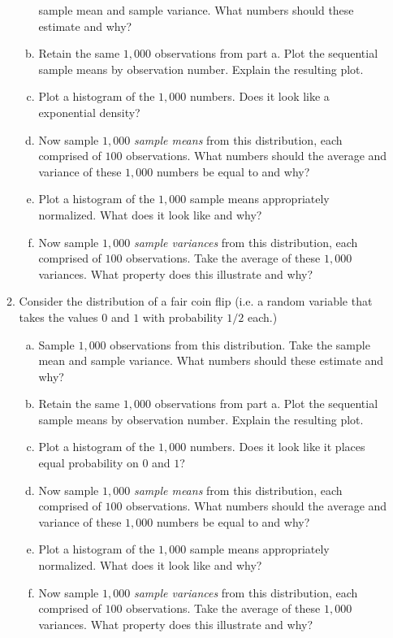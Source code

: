\documentclass[12pt]{article}
\begin{document}
\begin{enumerate}[1.]
\begin{enumerate}[1.]
\begin{enumerate}[a.]
    sample mean and sample variance. What numbers should these
    estimate and why?
  \item Retain the same $1,000$ observations from part a. Plot the
    sequential sample means by observation number. Explain the
    resulting plot.
  \item Plot a histogram of the $1,000$ numbers. Does it look like a
    exponential density?
  \item Now sample $1,000$ {\em sample means} from this distribution,
    each comprised of $100$ observations. What numbers should the
    average and variance of these $1,000$ numbers be equal to and why?
 \item Plot a histogram of the $1,000$ sample means appropriately
    normalized. What does it look like and why?
  \item Now sample $1,000$ {\em sample variances} from this distribution,
    each comprised of $100$ observations. Take the average of these
    $1,000$ variances. What property does this illustrate and why?
  \end{enumerate}
\item  Consider the distribution of a fair coin flip (i.e. a random variable
  that takes the values $0$ and $1$ with probability $1/2$ each.)
  \begin{enumerate}[a.]
  \item Sample $1,000$ observations from this distribution. Take the
    sample mean and sample variance. What numbers should these
    estimate and why?
  \item Retain the same $1,000$ observations from part a. Plot the
    sequential sample means by observation number. Explain the
    resulting plot.
  \item Plot a histogram of the $1,000$ numbers. Does it look like it places
    equal probability on $0$ and $1$?
  \item Now sample $1,000$ {\em sample means} from this distribution,
    each comprised of $100$ observations. What numbers should the
    average and variance of these $1,000$ numbers be equal to and why?
 \item Plot a histogram of the $1,000$ sample means appropriately
    normalized. What does it look like and why?
  \item Now sample $1,000$ {\em sample variances} from this distribution,
    each comprised of $100$ observations. Take the average of these
    $1,000$ variances. What property does this illustrate and why?
  \end{enumerate}  

\end{enumerate}
\end{enumerate}
\end{document}

